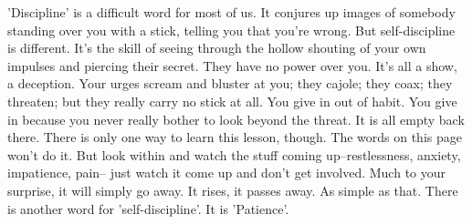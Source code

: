 'Discipline' is a difficult word for most of us. It conjures up images of
somebody standing over you with a stick, telling you that you're wrong. But
self-discipline is different. It's the skill of seeing through the hollow
shouting of your own impulses and piercing their secret. They have no power over
you. It's all a show, a deception. Your urges scream and bluster at you; they
cajole; they coax; they threaten; but they really carry no stick at all. You
give in out of habit. You give in because you never really bother to look beyond
the threat. It is all empty back there. There is only one way to learn this
lesson, though. The words on this page won't do it. But look within and watch
the stuff coming up--restlessness, anxiety, impatience, pain-- just watch it
come up and don't get involved. Much to your surprise, it will simply go away.
It rises, it passes away. As simple as that. There is another word for
'self-discipline'. It is 'Patience'.